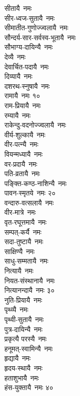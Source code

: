 \begin{multicols}{2}
\begin{flushleft}
सीतायै~नमः\\
सीर-ध्वज-सुतायै~नमः\\
सीमातीत-गुणोज्ज्वलायै~नमः\\
सौन्दर्य-सार-सर्वस्व-भूतायै~नमः\\
सौभाग्य-दायिन्यै~नमः\\
देव्यै~नमः\\
देवार्चित-पदायै~नमः \\
दिव्यायै~नमः\\
दशरथ-स्नुषायै~नमः\\
रामायै~नमः \hfill १०\\
राम-प्रियायै~नमः\\
रम्यायै~नमः  \\
राकेन्दु-वदनोज्ज्वलायै~नमः\\
वीर्य-शुल्कायै~नमः\\
वीर-पत्न्यै~नमः\\
वियन्मध्यायै~नमः\\
वर-प्रदायै~नमः\\
पति-व्रतायै~नमः\\
पङ्क्ति-कण्ठ-नाशिन्यै~नमः \\
पावन-स्मृतये~नमः \hfill २०\\
वन्दारु-वत्सलायै~नमः\\
वीर-मात्रे~नमः\\
वृत-रघूत्तमायै~नमः\\
सम्पत्-कर्यै~नमः\\
सदा-तुष्टायै~नमः\\
साक्षिण्यै~नमः\\
साधु-सम्मतायै~नमः\\
नित्यायै~नमः\\
नियत-संस्थानायै~नमः\\
नित्यानन्दायै~नमः \hfill ३०\\
नुति-प्रियायै~नमः\\
पृथ्व्यै~नमः\\
पृथ्वी-सुतायै~नमः\\
पुत्र-दायिन्यै~नमः\\
प्रकृत्यै परस्यै~नमः\\
हनूमत्-स्वामिन्यै~नमः\\
हृद्यायै~नमः\\
हृदय-स्थायै~नमः\\
हताशुभायै~नमः\\
हंस-युक्तायै~नमः \hfill ४०\\

\end{flushleft}
\end{multicols}
